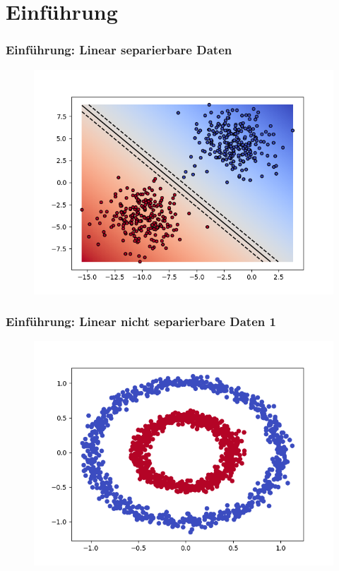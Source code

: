 \section{Einführung}
	\begin{frame}
		\frametitle{Einführung: Linear separierbare Daten}
			\begin{figure}
					\includegraphics[width=\textwidth]{img/linearsvm.png}
			\end{figure}
	\end{frame}
	
	\begin{frame}
		\frametitle{Einführung: Linear nicht separierbare Daten 1}
			\begin{figure}
					\includegraphics[width=\textwidth]{img/nonlinearsvm.png}
			\end{figure}
	\end{frame}
	
